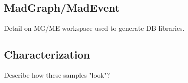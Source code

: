 \subsection{MadGraph/MadEvent}
\begin{todoenv}Detail on MG/ME workspace used to generate DB libraries.\end{todoenv}

\subsection{Characterization}
\begin{todoenv}Describe how these samples "look"?\end{todoenv}

